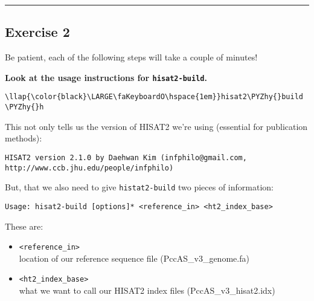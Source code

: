\documentclass[11pt]{article}
\def\PYZhy{\char`\-}
\begin{document}
    \begin{center}\rule{0.5\linewidth}{.4pt}\end{center}

    \hypertarget{exercise-2}{%
\subsection{Exercise 2}\label{exercise-2}}

    Be patient, each of the following steps will take a couple of minutes!

    \textbf{Look at the usage instructions for \texttt{hisat2-build}.}





\begin{terminalinput}
\begin{Verbatim}[commandchars=\\\{\}]
\llap{\color{black}\LARGE\faKeyboardO\hspace{1em}}hisat2\PYZhy{}build \PYZhy{}h
\end{Verbatim}
\end{terminalinput}



    This not only tells us the version of HISAT2 we're using (essential for
publication methods):

\begin{verbatim}
HISAT2 version 2.1.0 by Daehwan Kim (infphilo@gmail.com, http://www.ccb.jhu.edu/people/infphilo)
\end{verbatim}

But, that we also need to give \texttt{histat2-build} two pieces of
information:

\begin{verbatim}
Usage: hisat2-build [options]* <reference_in> <ht2_index_base>
\end{verbatim}

These are:

\begin{itemize}
\item
  \texttt{\textless{}reference\_in\textgreater{}}~\\
  location of our reference sequence file (PccAS\_v3\_genome.fa)
\item
  \texttt{\textless{}ht2\_index\_base\textgreater{}}~\\
  what we want to call our HISAT2 index files (PccAS\_v3\_hisat2.idx)
\end{itemize}
\end{document}
